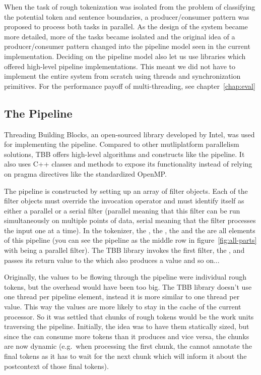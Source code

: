 When the task of rough tokenization was isolated from the problem of
classifying the potential token and sentence boundaries, a producer/consumer
pattern was proposed to process both tasks in parallel. As the design of the
system became more detailed, more of the tasks became isolated and the original
idea of a producer/consumer pattern changed into the pipeline model seen in the
current implementation. Deciding on the pipeline model also let us use
libraries which offered high-level pipeline implementations. This meant we did
not have to implement the entire system from scratch using threads and
synchronization primitives. For the performance payoff of multi-threading, see
chapter~\ref{chap:eval}

\subsection{The Pipeline}
\label{ssec:impl-parallel-pipeline}

Threading Building Blocks, an open-sourced library developed by Intel, was used
for implementing the pipeline. Compared to other mutliplatform parallelism
solutions, TBB offers high-level algorithms and constructs like the pipeline.
It also uses C++ classes and methods to expose its functionality instead of
relying on pragma directives like the standardized OpenMP. 

The pipeline is constructed by setting up an array of filter objects. Each of
the filter objects must override the invocation operator and must identify
itself as either a parallel or a serial filter (parallel meaning that this
filter can be run simultaneously on multiple points of data, serial meaning
that the filter processes the input one at a time). In the tokenizer, the
, the , the 
and the  are all elements of this pipeline (you can see
the pipeline as the middle row in figure~\ref{fig:all-parts} with
 being a parallel filter). The TBB library invokes the
first filter, the , and passes its return value to the
 which also produces a value and so on...

Originally, the values to be flowing through the pipeline were individual rough
tokens, but the overhead would have been too big. The TBB library doesn't use
one thread per pipeline element, instead it is more similar to one thread per
value. This way the values are more likely to stay in the cache of the current
processor. So it was settled that chunks of rough tokens would be the work
units traversing the pipeline. Initially, the idea was to have them statically
sized, but since the  can consume more tokens than it
produces and vice versa, the chunks are now dynamic (e.g.\ when processing the
first chunk, the  cannot annotate the final tokens as it has
to wait for the next chunk which will inform it about the postcontext of those
final tokens).

